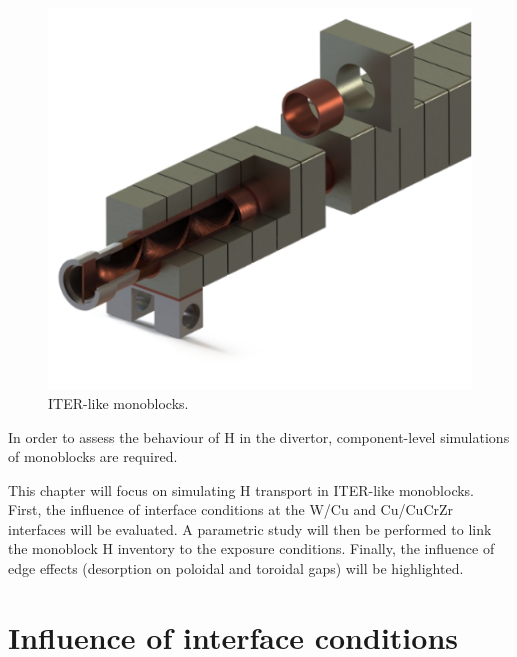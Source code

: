 \begin{figure}
    \centering
    \includegraphics[width=0.7\linewidth]{Figures/Chapter3/monoblocks_with_pipe.png}
    \caption{ITER-like monoblocks.}
    \label{fig: monoblocks with pipe}
\end{figure}

In order to assess the behaviour of H in the divertor, component-level simulations of monoblocks are required.

This chapter will focus on simulating H transport in ITER-like monoblocks.
First, the influence of interface conditions at the W/Cu and Cu/CuCrZr interfaces will be evaluated.
A parametric study will then be performed to link the monoblock H inventory to the exposure conditions.
Finally, the influence of edge effects (desorption on poloidal and toroidal gaps) will be highlighted.

\section{Influence of interface conditions}




